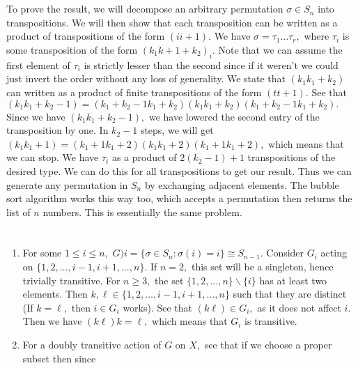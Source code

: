 \documentclass{article}
\title{} %
\author{Gandhar Kulkarni (mmat2304)} %
\date{} %
\begin{document}
\maketitle %


\section{} %
To prove the result, we will decompose an arbitrary permutation $\sigma \in S_n$ into transpositions. We will then show that each transposition can be 
written as a product of transpositions of the form $(i i+1).$ We have $\sigma=\tau_1\dots\tau_r,$ where $\tau_i$ is some transposition of the form $(k_1 
k+1+k_2)_i.$ Note that we can assume the first element of $\tau_i$ is strictly lesser than the second since if it weren't we could just invert the order 
without any loss of generality. We state that $(k_1 k_1+k_2)$ can written as a product of finite transpositions of the form $(t t+1).$ See that $(k_1 
k_1+k_2-1)=(k_1+k_2-1 k_1+k_2)(k_1 k_1+k_2)(k_1+k_2-1 k_1+k_2).$ Since we have $(k_1 k_1+k_2-1),$ we have lowered the second entry of the transposition by 
one. In $k_2-1$ steps, we will get $(k_1 k_1+1)=(k_1+1 k_1+2)(k_1 k_1+2)(k_1+1 k_1+2),$ which means that we can stop. We have $\tau_i$ as a product of 
$2(k_2-1)+1$ transpositions of the desired type. We can do this for all transpositions to get our result. Thus we can generate any permutation in $S_n$ by 
exchanging adjacent elements. 
The bubble sort algorithm works this way too, which accepts a permutation then returns the list of $n$ numbers. This is essentially the same problem.
\section{} %
\section{} %
\begin{enumerate}
	\item For some $1 \leq i \leq n,$ $G)i=\{\sigma \in S_n: \sigma(i)=i\} \cong S_{n-1}.$ Consider $G_i$ acting on $\{1,2,\dots,i-1,i+1,\dots,n\}.$
	If $n=2,$ this set will be a singleton, hence trivially transitive. For $n \geq 3,$ the set $\{1,2,\dots,n\}\backslash\{i\}$ has at least two elements. 
	Then $k,\ell \in \{1,2,\dots,i-1,i+1,\dots,n\}$ such that they are distinct (If $k=\ell,$ then $i \in G_i$ works). See that $ (k \ell) \in G_i,$ as it 
	does not affect $i.$ Then we have $(k \ell)k=\ell,$ which means that $G_i$ is transitive. 
	\item For a doubly transitive action of $G$ on $X,$ see that if we choose a proper subset then since 
\end{enumerate}
\end{document}
